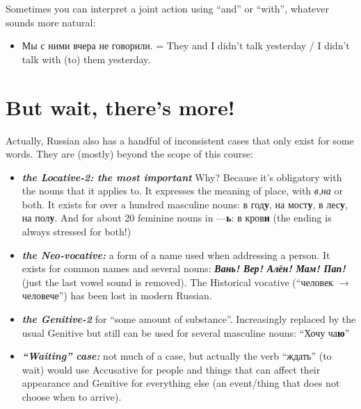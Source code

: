 Sometimes you can interpret a joint action using ``and'' or ``with'',
whatever sounds more natural:

\begin{itemize}
\tightlist
\item
  Мы с ними вчера не говорили. = They and I didn't talk yesterday / I
  didn't talk with (to) them yesterday.
\end{itemize}

\section{But wait, there's more!}\label{but-wait-theres-more}

Actually, Russian also has a handful of inconsistent cases that only
exist for some words. They are (mostly) beyond the scope of this course:

\begin{itemize}
\tightlist
\item
  \textbf{\emph{the Locative-2: the most important}} Why? Because it's
  obligatory with the nouns that it applies to. It expresses the meaning
  of place, with \emph{в},\emph{на} or both. It exists for over a
  hundred masculine nouns: в год\textbf{у}, на мост\textbf{у}, в
  лес\textbf{у}, на пол\textbf{у}. And for about 20 feminine nouns in
  ---\textbf{ь}: в кров\textbf{и} (the ending is always stressed for
  both!)
\item
  \textbf{\emph{the Neo-vocative:}} a form of a name used when
  addressing a person. It exists for common names and several nouns:
  \textbf{\emph{Вань! Вер! Алён! Мам! Пап!}} (just the last vowel sound
  is removed). The Historical vocative (``человек $ \rightarrow$ человече'') has been
  lost in modern Russian.
\item
  \textbf{\emph{the Genitive-2}} for ``some amount of substance''.
  Increasingly replaced by the usual Genitive but still can be used for
  several masculine nouns: ``Хочу ча\textbf{ю}''
\item
  \textbf{\emph{``Waiting'' case:}} not much of a case, but actually the
  verb ``ждать'' (to wait) would use Accusative for people and things
  that can affect their appearance and Genitive for everything else (an
  event/thing that does not choose when to arrive).
\end{itemize}
